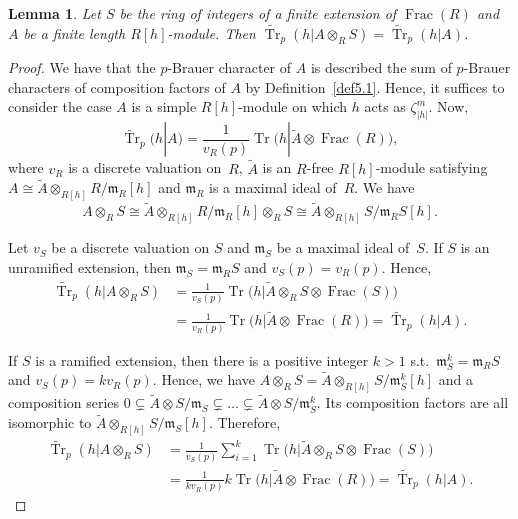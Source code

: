 \documentclass[10pt,a4paper]{amsart}
\numberwithin{equation}{section}
\newtheorem{Lemma}[Theorem]{Lemma}
\begin{document}
\begin{Lemma}\label{tensorBch}
Let $S$ be the ring of integers of a finite extension of $\operatorname{Frac}(R)$ and $A$ be a finite length $R[h]$-module. Then $\widetilde{\operatorname{Tr}}_p(h|A\otimes_{R}S)=\widetilde{\operatorname{Tr}}_p(h|A)$.
\end{Lemma}

\begin{proof}
We have that the $p$-Brauer character of $A$ is described the sum of $p$-Brauer characters of composition factors of $A$ by Definition~\ref{def5.1}. Hence, it suffices to consider the case $A$ is a simple $R[h]$-module on which $h$ acts as $\zeta_{|h|}^m$. Now,
\[
\widetilde{\operatorname{Tr}}_p(h|A)=\frac{1}{v_R(p)}\operatorname{Tr} \big(h|\widetilde{A}\otimes \operatorname{Frac}(R)\big),
\]
where $v_R$ is a discrete valuation on~$R$, $\widetilde{A}$ is an $R$-free $R[h]$-module satisfying $A\cong \widetilde{A}\otimes_{R[h]} R/\mathfrak{m}_R[h]$ and $\mathfrak{m}_R$ is a maximal ideal of~$R$. We have
\[
A\otimes_R S\cong \widetilde{A}\otimes_{R[h]} R/\mathfrak{m}_R[h]\otimes_R S\cong \widetilde{A}\otimes_{R[h]} S/\mathfrak{m}_RS[h].
\]

 Let $v_S$ be a discrete valuation on $S$ and $\mathfrak{m}_S$ be a maximal ideal of~$S$. If $S$ is an unramified extension, then $\mathfrak{m}_S=\mathfrak{m}_RS$ and $v_S(p)=v_R(p)$. Hence,
 \begin{align*}
\widetilde{\operatorname{Tr}}_p(h|A\otimes_R S) &=\frac{1}{v_S(p)}\operatorname{Tr}\big(h|\widetilde{A}\otimes_R S\otimes \operatorname{Frac}(S)\big)\\
& =\frac{1}{v_R(p)}\operatorname{Tr}\big(h|\widetilde{A}\otimes \operatorname{Frac}(R)\big)=\widetilde{\operatorname{Tr}}_p(h|A).
 \end{align*}

 If $S$ is a ramified extension, then there is a positive integer $k>1$ s.t.\ $\mathfrak{m}_S^k=\mathfrak{m}_RS$ and $v_S(p)=kv_R(p)$. Hence, we have $A\otimes_R S=\widetilde{A}\otimes_{R[h]}S/\mathfrak{m}_S^k[h]$ and a composition series $0\subsetneq \widetilde{A}\otimes S/\mathfrak{m}_S\subsetneq \dots \subsetneq \widetilde{A}\otimes S/\mathfrak{m}_S^k$. Its composition factors are all isomorphic to $\widetilde{A}\otimes_{R[h]} S/\mathfrak{m}_S[h]$. Therefore,
\begin{align*}
\widetilde{\operatorname{Tr}}_p(h|A\otimes_R S) & =\frac{1}{v_S(p)}\sum_{i=1}^k\operatorname{Tr} \big(h|\widetilde{A}\otimes_R S\otimes \operatorname{Frac}(S)\big)\\
& =\frac{1}{kv_R(p)}k\operatorname{Tr}\big(h|\widetilde{A}\otimes \operatorname{Frac}(R)\big) =\widetilde{\operatorname{Tr}}_p(h|A).\tag*{\qed}
\end{align*}\renewcommand{\qed}{}
\end{proof}
\end{document}

